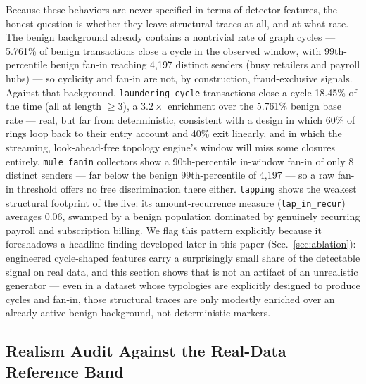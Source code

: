 Because these behaviors are never specified in terms of detector features, the
honest question is whether they leave structural traces at all, and at what
rate. The benign background already contains a nontrivial rate of graph
cycles — 5.761\% of benign transactions close a cycle in the observed window,
with 99th-percentile benign fan-in reaching 4{,}197 distinct senders (busy
retailers and payroll hubs) — so cyclicity and fan-in are not, by
construction, fraud-exclusive signals. Against that background,
\texttt{laundering\_cycle} transactions close a cycle 18.45\% of the time (all
at length $\geq 3$), a $3.2\times$ enrichment over the 5.761\% benign base
rate — real, but far from deterministic, consistent with a design in which
60\% of rings loop back to their entry account and 40\% exit linearly, and in
which the streaming, look-ahead-free topology engine's window will miss some
closures entirely. \texttt{mule\_fanin} collectors show a 90th-percentile
in-window fan-in of only 8 distinct senders — far below the benign
99th-percentile of 4{,}197 — so a raw fan-in threshold offers no free
discrimination there either. \texttt{lapping} shows the weakest structural
footprint of the five: its amount-recurrence measure
(\texttt{lap\_in\_recur}) averages 0.06, swamped by a benign population
dominated by genuinely recurring payroll and subscription billing. We flag
this pattern explicitly because it foreshadows a headline finding developed
later in this paper (Sec.~\ref{sec:ablation}): engineered cycle-shaped
features carry a surprisingly small share of the detectable signal on real
data, and this section shows that is not an artifact of an unrealistic
generator — even in a dataset whose typologies are explicitly designed to
produce cycles and fan-in, those structural traces are only modestly
enriched over an already-active benign background, not deterministic
markers.

\subsection{Realism Audit Against the Real-Data Reference Band}
\label{sec:synthetic-realism}

